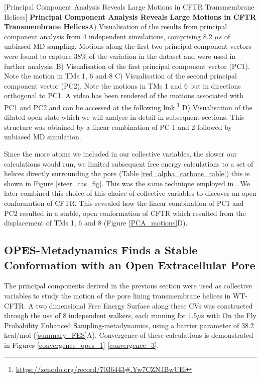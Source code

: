 	[Principal Component Analysis Reveals Large Motions in CFTR Transmembrane Helices] {\textbf{Principal Component Analysis Reveals Large Motions in CFTR Transmembrane Helices}}{A) Visualisation of the results from principal component analysis from 4 independent simulations, comprising 8.2 $\mu s$ of unbiased MD sampling. Motions along the first two principal component vectors were found to capture 38\% of the variation in the dataset and were used in further analysis. B) Visualisation of the first principal component vector (PC1). Note the motion in TMs 1, 6 and 8 C) Visualisation of the second principal component vector (PC2). Note the motions in TMs 1 and 6 but in directions orthogonal to PC1. A video has been rendered of the motions associated with PC1 and PC2 and can be accessed at the following \href{https://zenodo.org/record/7036443#.Yw7CZNJBwUE}{link}.\footnote{\href{https://zenodo.org/record/7036443\#.Yw7CZNJBwUEi}{https://zenodo.org/record/7036443\#.Yw7CZNJBwUEi}} D) Visualisation of the dilated open state which we will analyse in detail in subsequent sections. This structure was obtained by a linear combination of PC 1 and 2 followed by unbiased MD simulation. } 
	\label{PCA_motions}
	\endgroup

Since the more atoms we included in our collective variables, the slower our calculations would run, we limited subsequent free energy calculations to a set of helices directly surrounding the pore (Table \ref{red_alpha_carbons_table}) this is shown in Figure \ref{steer_cas_fig}. This was the same technique employed in \cite{hoffmann2018}. We later combined this choice of this choice of collective variables to discover an open conformation of CFTR. This revealed how the linear combination of PC1 and PC2 resulted in a stable, open conformation of CFTR which resulted from the displacement of TMs 1, 6 and 8 (Figure \ref{PCA_motions}D). 

\subsection{OPES-Metadynamics Finds a Stable Conformation with an Open Extracellular Pore}

The principal components derived in the previous section were used as collective variables to study the motion of the pore lining transmembrane helices in WT-CFTR. A two dimensional Free Energy Surface along these CVs was constructed through the use of 8 independent walkers, each running for $1.5\mu$s with On the Fly Probability Enhanced Sampling-metadynamics, using a barrier parameter of 38.2 kcal/mol (\ref{summary_FES}A). Convergence of these calculations is demonstrated in Figures \ref{convergence_opes_1}-\ref{convergence_3}. 

